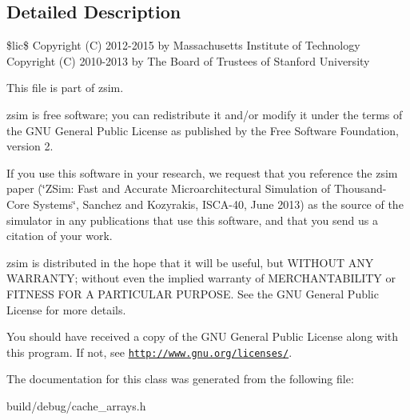 \subsection{Detailed Description}
\$lic\$ Copyright (C) 2012-\/2015 by Massachusetts Institute of Technology Copyright (C) 2010-\/2013 by The Board of Trustees of Stanford University

This file is part of zsim.

zsim is free software; you can redistribute it and/or modify it under the terms of the G\-N\-U General Public License as published by the Free Software Foundation, version 2.

If you use this software in your research, we request that you reference the zsim paper (\char`\"{}\-Z\-Sim\-: Fast and Accurate Microarchitectural Simulation of
\-Thousand-\/\-Core Systems\char`\"{}, Sanchez and Kozyrakis, I\-S\-C\-A-\/40, June 2013) as the source of the simulator in any publications that use this software, and that you send us a citation of your work.

zsim is distributed in the hope that it will be useful, but W\-I\-T\-H\-O\-U\-T A\-N\-Y W\-A\-R\-R\-A\-N\-T\-Y; without even the implied warranty of M\-E\-R\-C\-H\-A\-N\-T\-A\-B\-I\-L\-I\-T\-Y or F\-I\-T\-N\-E\-S\-S F\-O\-R A P\-A\-R\-T\-I\-C\-U\-L\-A\-R P\-U\-R\-P\-O\-S\-E. See the G\-N\-U General Public License for more details.

You should have received a copy of the G\-N\-U General Public License along with this program. If not, see \href{http://www.gnu.org/licenses/}{\tt http\-://www.\-gnu.\-org/licenses/}. 

The documentation for this class was generated from the following file\-:\begin{DoxyCompactItemize}
\item 
build/debug/cache\-\_\-arrays.\-h\end{DoxyCompactItemize}
